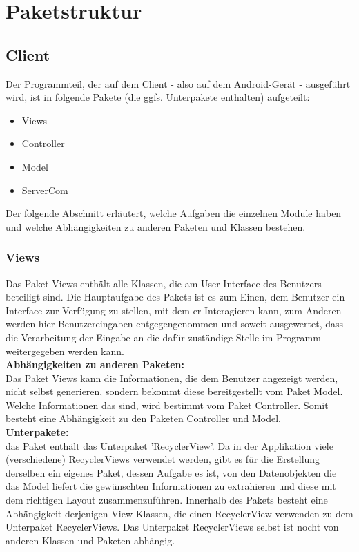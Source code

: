 \documentclass[11pt,a4paper]{report}
\begin{document}
\section{Paketstruktur}

\subsection{Client}
Der Programmteil, der auf dem Client - also auf dem Android-Gerät - ausgeführt wird, ist in folgende Pakete (die ggfs. Unterpakete enthalten) aufgeteilt:
\begin{itemize}
	\item Views
	\item Controller
	\item Model
	\item ServerCom
\end{itemize}

Der folgende Abschnitt erläutert, welche Aufgaben die einzelnen Module haben und welche Abhängigkeiten zu anderen Paketen und Klassen bestehen.

\subsubsection{Views}
Das Paket Views enthält alle Klassen, die am User Interface des Benutzers beteiligt sind. Die Hauptaufgabe des Pakets ist es zum Einen, dem Benutzer ein Interface zur Verfügung zu stellen, mit dem er Interagieren kann, zum Anderen werden hier Benutzereingaben entgegengenommen und soweit ausgewertet, dass die Verarbeitung der Eingabe an die dafür zuständige Stelle im Programm weitergegeben werden kann.\\

\textbf{Abhängigkeiten zu anderen Paketen:}\\
Das Paket Views kann die Informationen, die dem Benutzer angezeigt werden, nicht selbst generieren, sondern bekommt diese bereitgestellt vom Paket Model. Welche Informationen das sind, wird bestimmt vom Paket Controller. Somit besteht eine Abhängigkeit zu den Paketen Controller und Model.\\

\textbf{Unterpakete:}\\
das Paket enthält das Unterpaket 'RecyclerView'. Da in der Applikation viele (verschiedene) RecyclerViews verwendet werden, gibt es für die Erstellung derselben ein eigenes Paket, dessen Aufgabe es ist, von den Datenobjekten die das Model liefert die gewünschten Informationen zu extrahieren und diese mit dem richtigen Layout zusammenzuführen. Innerhalb des Pakets besteht eine Abhängigkeit derjenigen View-Klassen, die einen RecyclerView verwenden zu dem Unterpaket RecyclerViews. Das Unterpaket RecyclerViews selbst ist nocht von anderen Klassen und Paketen abhängig.
\end{document}
